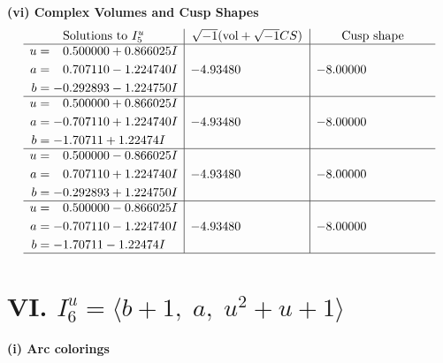\documentclass[1p]{elsarticle_modified}
\theoremstyle{definition}
\newcommand{\I}{\sqrt{-1}}
\begin{document}
\newpage\flushleft \textbf{(vi) Complex Volumes and Cusp Shapes}
$$\begin{array}{c|c|c}  
\text{Solutions to }I^u_{5}& \I (\text{vol} + \sqrt{-1}CS) & \text{Cusp shape}\\
 \hline 
\begin{aligned}
u &= \phantom{-}0.500000 + 0.866025 I \\
a &= \phantom{-}0.707110 - 1.224740 I \\
b &= -0.292893 - 1.224750 I\end{aligned}
 & -4.93480\phantom{ +0.000000I} & -8.00000\phantom{ +0.000000I} \\ \hline\begin{aligned}
u &= \phantom{-}0.500000 + 0.866025 I \\
a &= -0.707110 + 1.224740 I \\
b &= -1.70711 + 1.22474 I\end{aligned}
 & -4.93480\phantom{ +0.000000I} & -8.00000\phantom{ +0.000000I} \\ \hline\begin{aligned}
u &= \phantom{-}0.500000 - 0.866025 I \\
a &= \phantom{-}0.707110 + 1.224740 I \\
b &= -0.292893 + 1.224750 I\end{aligned}
 & -4.93480\phantom{ +0.000000I} & -8.00000\phantom{ +0.000000I} \\ \hline\begin{aligned}
u &= \phantom{-}0.500000 - 0.866025 I \\
a &= -0.707110 - 1.224740 I \\
b &= -1.70711 - 1.22474 I\end{aligned}
 & -4.93480\phantom{ +0.000000I} & -8.00000\phantom{ +0.000000I}\\
 \hline 
 \end{array}$$\newpage\newpage\renewcommand{\arraystretch}{1}
\centering \section*{VI. $I^u_{6}= \langle b+1,\;a,\;u^2+u+1 \rangle$}
\flushleft \textbf{(i) Arc colorings}\\
\end{document}
